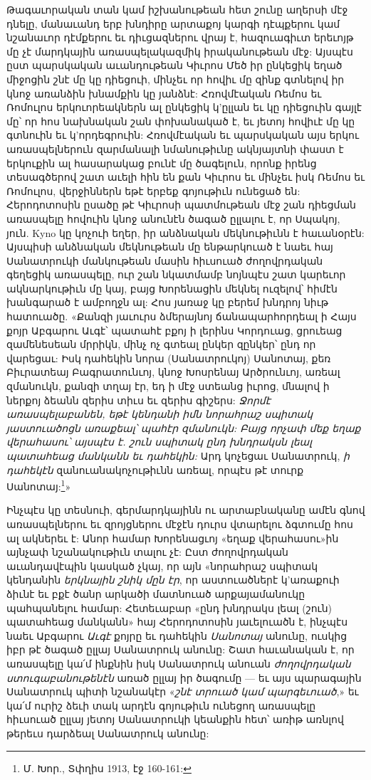 \documentclass{article}
\begin{document}
{Թագաւորական տան կամ իշխանութեան հետ շունը աղերսի մէջ դնելը, մանաւանդ երբ խնդիրը արտաքոյ կարգի դէպքերու կամ նշանաւոր դէմքերու եւ դիւցազներու վրայ է, հազուագիւտ երեւոյթ մը չէ մարդկային առասպելակազմիկ իրականութեան մէջ: Այսպէս ըստ պարսկական աւանդութեան Կիւրոս Մեծ իր ընկեցիկ եղած միջոցին շնէ մը կը դիեցուի, մինչեւ որ հովիւ մը զինք գտնելով իր կնոջ առանձին խնամքին կը յանձնէ: Հռովմէական Ռեմոս եւ Ռոմուլոս երկուորեակներն ալ ընկեցիկ կ'ըլլան եւ կը դիեցուին գայլէ մը՝ որ հոս նախնական շան փոխանակած է, եւ յետոյ հովիւէ մը կը գտնուին եւ կ'որդեգրուին: Հռովմէական եւ պարսկական այս երկու առասպելներուն զարմանալի նմանութիւնը ակնյայտնի փաստ է երկուքին ալ հասարակաց բունէ մը ծագելուն, որոնք իրենց տեսագծերով շատ աւելի հին են քան Կիւրոս եւ մինչեւ իսկ Ռեմոս եւ Ռոմուլոս, վերջիններն եթէ երբեք գոյութիւն ունեցած են: Հերոդոտոսին ըսածը թէ Կիւրոսի պատմութեան մէջ շան դիեցման առասպելը հովուին կնոջ անունէն ծագած ըլլալու է, որ Սպակոյ, յուն. Kyno կը կոչուի եղեր, իր անձնական մեկնութիւնն է հաւանօրէն: Այսպիսի անձնական մեկնութեան մը ենթարկուած է նաեւ հայ Սանատրուկի մանկութեան մասին հիւսուած ժողովրդական գեղեցիկ առասպելը, ուր շան նկատմամբ նոյնպէս շատ կարեւոր ակնարկութիւն մը կայ, բայց Խորենացին մեկնել ուզելով՝ հիմէն խանգարած է ամբողջն ալ: Հոս յառաջ կը բերեմ խնդրոյ նիւթ հատուածը. «Քանզի յաւուրս ձմերայնոյ ճանապարհորդեալ ի Հայս քոյր Աբգարու Աւգէ՝ պատահէ բքոյ ի լերինս Կորդուաց, ցրուեաց զամենեսեան մրրիկն, մինչ ոչ գտեալ ընկեր զընկեր՝ ընդ որ վարեցաւ: Իսկ դահեկին նորա (Սանատրուկոյ) Սանոտայ, քեռ Բիւրատեայ Բագրատունւոյ, կնոջ Խոսրենայ Արծրունւոյ, առեալ զմանուկն, քանզի տղայ էր, եդ ի մէջ ստեանց իւրոց, մնալով ի ներքոյ ձեանն զերիս տիւս եւ զերիս գիշերս: \emph{Ջորմէ առասպելաբանեն, եթէ կենդանի իմն նորահրաշ սպիտակ յաստուածոցն առաքեալ՝ պահէր զմանուկն: Բայց որչափ մեք եղաք վերահասու՝ այսպէս է. շուն սպիտակ ընդ խնդրակսն լեալ պատահեաց մանկանն եւ դահեկին:} Արդ կոչեցաւ Սանատրուկ, \emph{ի դահեկէն} զանուանակոչութիւնն առեալ, որպէս թէ տուրք Սանոտայ:\footnote{Մ. Խոր., Տփղիս 1913, էջ 160-161:}»

Ինչպէս կը տեսնուի, գերմարդկայինն ու արտաբնականը ամէն գնով առասպելներու եւ զրոյցներու մէջէն դուրս վտարելու ձգտումը հոս ալ ակներեւ է: Անոր համար Խորենացւոյ «եղաք վերահասու»ին այնչափ նշանակութիւն տալու չէ: Ըստ ժողովրդական աւանդավէպին կասկած չկայ, որ այն «նորահրաշ սպիտակ կենդանին \emph{երկնային շնիկ մըն էր}, որ աստուածներէ կ'առաքուի ձիւնէ եւ բքէ ծանր արկածի մատնուած արքայամանուկը պահպանելու համար: Հետեւաբար «ընդ խնդրակս լեալ (շուն) պատահեաց մանկանն» հայ Հերոդոտոսին յաւելուածն է, ինչպէս նաեւ Աբգարու \emph{Աւգէ} քոյրը եւ դահեկին \emph{Սանոտայ} անունը, ուսկից իբր թէ ծագած ըլլայ Սանատրուկ անունը: Շատ հաւանական է, որ առասպելը կա՛մ ինքնին իսկ Սանատրուկ անուան \emph{ժողովրդական ստուգաբանութենէն} առած ըլլայ իր ծագումը — եւ այս պարագային Սանատրուկ պիտի նշանակէր «\emph{շնէ տրուած կամ պարգեւուած},» եւ կա՛մ ուրիշ ձեւի տակ արդէն գոյութիւն ունեցող առասպելը հիւսուած ըլլայ յետոյ Սանատրուկի կեանքին հետ՝ առիթ առնլով թերեւս դարձեալ Սանատրուկ անունը:

}
\end{document}
